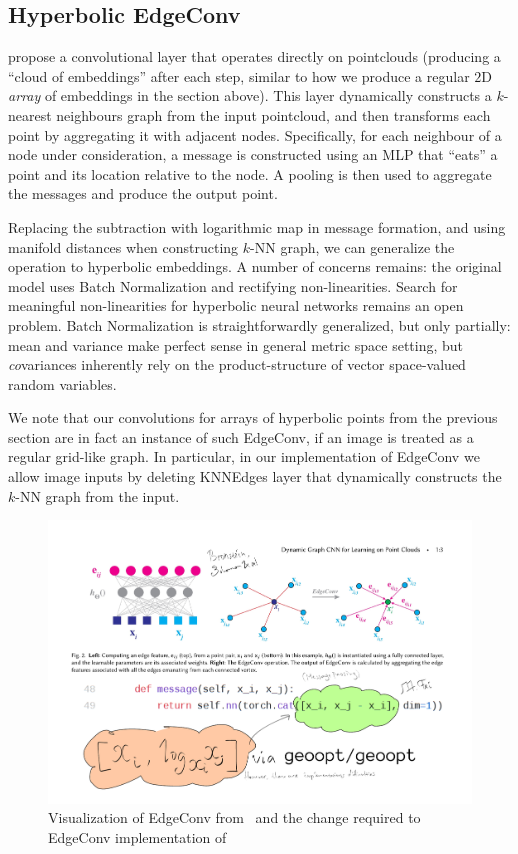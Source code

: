 \subsection{Hyperbolic EdgeConv} \label{sec:hedgeconv}

\citet{edgeconv} propose a convolutional layer that operates directly on
pointclouds (producing a ``cloud of embeddings'' after each step, similar to
how we produce a regular \( 2 \)D \emph{array} of embeddings in the section
above). This layer dynamically constructs a \( k \)-nearest neighbours graph
from the input pointcloud, and then transforms each point by aggregating it
with adjacent nodes. Specifically, for each neighbour of a node under
consideration, a message is constructed using an MLP that ``eats'' a point and its
location relative to the node. A pooling is then used to aggregate the messages
and produce the output point.

Replacing the subtraction with logarithmic map in message formation, and using
manifold distances when constructing \( k \)-NN graph, we can generalize the
operation to hyperbolic embeddings. A number of concerns remains: the original
model uses Batch Normalization and rectifying non-linearities. Search for
meaningful non-linearities for hyperbolic neural networks remains an open
problem. Batch Normalization is straightforwardly generalized, but only
partially: mean and variance make perfect sense in general metric space
setting, but \emph{co}variances inherently rely on the product-structure of
vector space-valued random variables.

We note that our convolutions for arrays of hyperbolic points from the previous
section are in fact an instance of such EdgeConv, if an image is treated as a
regular grid-like graph. In particular, in our implementation of EdgeConv we
allow image inputs by deleting \textrm{KNNEdges} layer that dynamically
constructs the \( k \)-NN graph from the input.

\begin{figure}[H]\center
\includegraphics[width=.75\textwidth]{art/hyperbolic-edgeconv.pdf}
\caption{
    Visualization of EdgeConv from~\citet{edgeconv} and the change
        required to EdgeConv implementation of~\citet{pytorchGeometric}
}
\end{figure}

